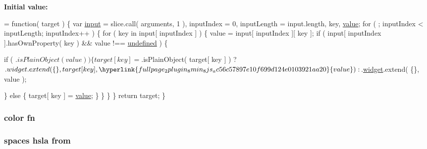 {\bfseries Initial value\+:}
\begin{DoxyCode}
= \textcolor{keyword}{function}( target ) \{
    var \hyperlink{validate_8js_a07a2aabd64594dc36dd810cad2669deb}{input} = slice.call( arguments, 1 ),
        inputIndex = 0,
        inputLength = input.length,
        key,
        \hyperlink{fullpage_2plugin_8min_8js_ac56c57897e10f699d124e0103921aa20}{value};
    \textcolor{keywordflow}{for} ( ; inputIndex < inputLength; inputIndex++ ) \{
        \textcolor{keywordflow}{for} ( key in input[ inputIndex ] ) \{
            value = input[ inputIndex ][ key ];
            \textcolor{keywordflow}{if} ( input[ inputIndex ].hasOwnProperty( key ) && value !== 
      \hyperlink{jquery-ui_8js_a08113a236cc18d2a9d5ce27e638012be}{undefined} ) \{
                
                \textcolor{keywordflow}{if} ( $.isPlainObject( value ) ) \{
                    target[ key ] = $.isPlainObject( target[ key ] ) ?
                        $.widget.extend( \{\}, target[ key ], \hyperlink{fullpage_2plugin_8min_8js_ac56c57897e10f699d124e0103921aa20}{value} ) :
                        
                        $.\hyperlink{jquery-ui_8js_a60d5947424f4fcd4ca9ed05e6dc43227}{widget}.extend( \{\}, value );
                
                \} \textcolor{keywordflow}{else} \{
                    target[ key ] = \hyperlink{fullpage_2plugin_8min_8js_ac56c57897e10f699d124e0103921aa20}{value};
                \}
            \}
        \}
    \}
    \textcolor{keywordflow}{return} target;
\}
\end{DoxyCode}
\hypertarget{jquery-ui_8js_a83f3b7c3c34f0779122b040056625b21}{
\subsubsection[{fn}]{\setlength{\rightskip}{0pt plus 5cm}color fn}}\label{jquery-ui_8js_a83f3b7c3c34f0779122b040056625b21}
\hypertarget{jquery-ui_8js_ace03b192fd101a1c5648340bc09b7229}{
\subsubsection[{from}]{\setlength{\rightskip}{0pt plus 5cm}spaces hsla from}}\label{jquery-ui_8js_ace03b192fd101a1c5648340bc09b7229}
